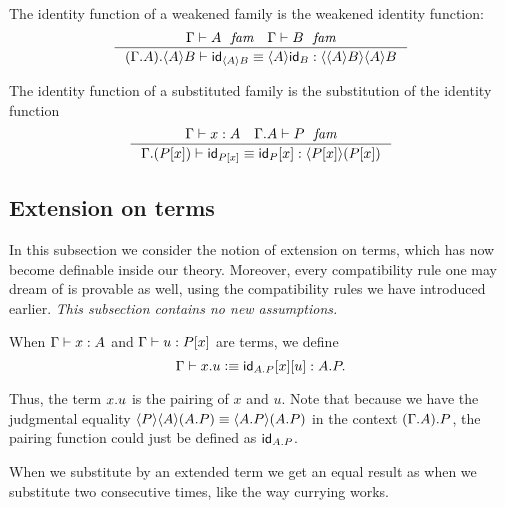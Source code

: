 The identity function of a weakened family is the weakened identity function:
\begin{equation}\label{idfunc-wk-comp}
\inference{\jfam{\Gamma}{A}\quad\jfam{\Gamma}{B}}{\jtermeq{{{\Gamma}{A}}{\ctxwk{A}{B}}}{\ctxwk{{A}{B}}{{A}{B}}}{\idfunc[\ctxwk{A}{B}]}{\ctxwk{A}{\idfunc[B]}}}
\end{equation}

The identity function of a substituted family is the substitution of the identity function
\begin{equation}\label{idfunc-subst-comp}
\inference{\jterm{\Gamma}{A}{x}\quad\jfam{{\Gamma}{A}}{P}}{\jtermeq{{\Gamma}{\subst{x}{P}}}{\ctxwk{\subst{x}{P}}{\subst{x}{P}}}{\idfunc[\subst{x}{P}]}{\subst{x}{\idfunc[P]}}}
\end{equation}

\subsection{Extension on terms}\label{extension-on-terms}
In this subsection we consider the notion of extension on terms, which has now
become definable inside our theory. Moreover, every compatibility rule one may
dream of is provable as well, using the compatibility rules we have introduced
earlier. \emph{This subsection contains no new assumptions.}

\begin{defn}
When $\jterm{\Gamma}{A}{x}$ and $\jterm{\Gamma}{\subst{x}{P}}{u}$ are terms,
we define 
\begin{equation*}
\jtermdefn{\Gamma}{\ctxext{A}{P}}{\ctxext{x}{u}}{\subst{u}{{x}{\idfunc[\ctxext{A}{P}]}}}.
\end{equation*} 
\end{defn}

Thus, the term $\ctxext{x}{u}$ is the pairing of $x$ and $u$. Note that because
we have the judgmental equality 
$\ctxwk{P}{{A}{\ctxext{A}{P}}}\jdeq\ctxwk{\ctxext{A}{P}}{\ctxext{A}{P}}$ in the
context $\ctxext{{\Gamma}{A}}{P}$, the
pairing function could just be defined as $\idfunc[\ctxext{A}{P}]$. 

When we substitute by an extended term we get an equal result as when we
substitute two consecutive times, like the way currying works.

